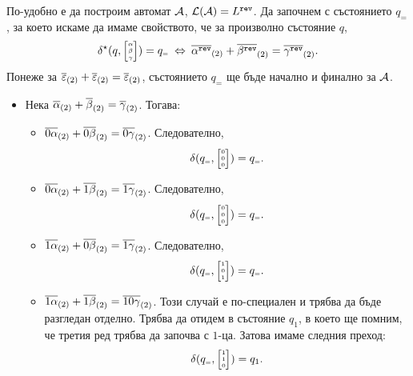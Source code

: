 \begin{hint}
  По-удобно е да построим автомат $\mathcal{A}$, $\mathcal{L}(\mathcal{A}) = L^{\texttt{rev}}$.
  Да започнем с състоянието $q_{\scriptscriptstyle{=}}$, за което искаме да имаме свойството, че за произволно състояние $q$,
  \[\delta^\star(q, \tiny{ \begin{bmatrix} \alpha\\ \beta \\ \gamma\end{bmatrix} }) = q_{\scriptscriptstyle{=}}  \ \Leftrightarrow\  \overline{\alpha^{\texttt{rev}}}_{(2)} + \overline{\beta^{\texttt{rev}}}_{(2)} = \overline{\gamma^{\texttt{rev}}}_{(2)}.\]
  Понеже за $\overline{\varepsilon}_{(2)} + \overline{\varepsilon}_{(2)} = \overline{\varepsilon}_{(2)}$, състоянието $q_{\scriptscriptstyle{=}}$ ще бъде начално и финално за $\mathcal{A}$.
  \begin{itemize}
  \item 
    Нека $\overline{\alpha}_{(2)}+\overline{\beta}_{(2)} = \overline{\gamma}_{(2)}$. Тогава:
    \begin{itemize}
    \item 
      $\overline{0\alpha}_{(2)} + \overline{0\beta}_{(2)} = \overline{0\gamma}_{(2)}$. Следователно,
      \[\delta(q_{\scriptscriptstyle{=}},\tiny{ \begin{bmatrix} 0\\ 0 \\ 0\end{bmatrix} }) = q_{\scriptscriptstyle{=}}.\]
    \item
      $\overline{0\alpha}_{(2)} + \overline{1\beta}_{(2)} = \overline{1\gamma}_{(2)}$. Следователно,
      \[\delta(q_{\scriptscriptstyle{=}},\tiny{ \begin{bmatrix} 0\\ 0 \\ 0\end{bmatrix} }) = q_{\scriptscriptstyle{=}}.\]
    \item
      $\overline{1\alpha}_{(2)} + \overline{0\beta}_{(2)} = \overline{1\gamma}_{(2)}$. Следователно,
      \[\delta(q_{\scriptscriptstyle{=}},\tiny{ \begin{bmatrix} 1\\ 0 \\ 1\end{bmatrix} }) = q_{\scriptscriptstyle{=}}.\]
    \item
      $\overline{1\alpha}_{(2)} + \overline{1\beta}_{(2)} = \overline{10\gamma}_{(2)}$. Този случай е по-специален и трябва да бъде разгледан отделно.
      Трябва да отидем в състояние $q_1$, в което ще помним, че третия ред трябва да започва с $1$-ца. Затова имаме следния преход:
      \[\delta(q_{\scriptscriptstyle{=}},\tiny{ \begin{bmatrix} 1\\ 1 \\ 0\end{bmatrix} }) = q_1.\]

\end{itemize}
\end{itemize}
\end{hint}
